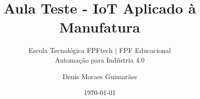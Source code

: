 
\title{Aula Teste - IoT Aplicado à Manufatura}

\subtitle{\vspace{0.8cm} Escola Tecnológica FPFtech | FPF Educacional \\
Automação para Indústria 4.0 \\
}

\author{Denis Moraes Guimarães}
\date{\today}
